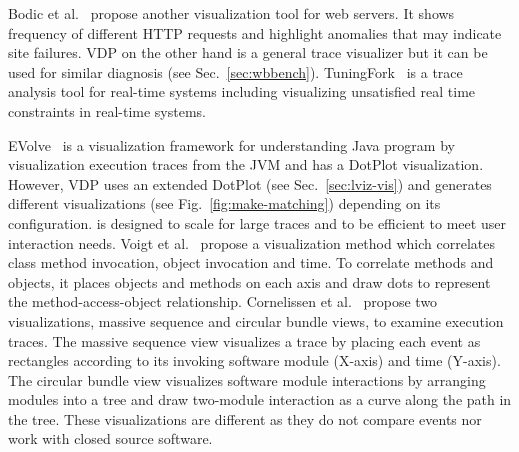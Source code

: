 Bodic et al.~\cite{bodik2005combining} propose another visualization tool for
web servers.
It shows frequency of different HTTP requests
and highlight anomalies that may indicate site failures.
VDP on the other hand is a general trace visualizer but
it can be used for similar diagnosis (see Sec.~\ref{sec:wbbench}).
TuningFork~\cite{bacon2007tuningfork} is a trace analysis tool for real-time
systems including visualizing unsatisfied real time constraints in real-time
systems.

EVolve~\cite{wang2003evolve} is a visualization framework for understanding
Java program by visualization execution traces from the JVM and
has a DotPlot visualization.
However, VDP uses an extended DotPlot (see Sec.~\ref{sec:lviz-vis})
and generates different visualizations (see Fig.~\ref{fig:make-matching})
depending on its configuration.
 is designed to scale for large traces and
to be efficient to meet user interaction needs.
Voigt et al.~\cite{voigt2009object} propose a visualization method which correlates
class method invocation, object invocation and time.
To correlate methods and objects, it places objects and methods
on each axis and draw dots to represent the
method-access-object relationship.
Cornelissen et al.~\cite{cornelissen2007understanding} propose two visualizations,
massive sequence and circular bundle views, to examine execution traces.
The massive sequence view visualizes a trace by placing each event as rectangles
according to its invoking software module (X-axis) and time (Y-axis).
The circular bundle view visualizes software module interactions by arranging
modules into a tree and draw two-module interaction as a curve along the
path in the tree.
These visualizations are different as they do not compare events 
nor work with closed source software.

